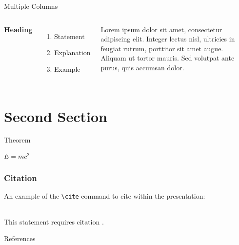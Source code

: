 \documentclass[aspectratio=169,xcolor=dvipsnames]{beamer}
\begin{document}

\begin{frame}{Multiple Columns}
    \begin{columns}[c] %

        \textbf{Heading}
        \begin{enumerate}
            \item Statement
            \item Explanation
            \item Example
        \end{enumerate}

        Lorem ipsum dolor sit amet, consectetur adipiscing elit. Integer lectus nisl, ultricies in feugiat rutrum, porttitor sit amet augue. Aliquam ut tortor mauris. Sed volutpat ante purus, quis accumsan dolor.

    \end{columns}
\end{frame}

\section{Second Section}

\begin{frame}{Theorem}
    \begin{theorem}
        $E = mc^2$
    \end{theorem}
\end{frame}

\begin{frame}[fragile] %
    \frametitle{Citation}
    An example of the \verb|\cite| command to cite within the presentation:\\~

    This statement requires citation \cite{p1}.
\end{frame}


\begin{frame}{References}
    \footnotesize
    
    
\end{frame}

\end{document}
